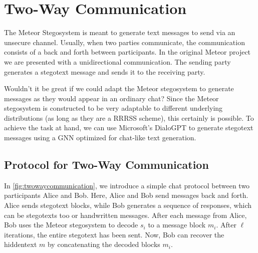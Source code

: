 \chapter{Two-Way Communication}
\label{chap:twowaycommunication}

The Meteor Stegosystem is meant to generate text messages to send via an unsecure channel.
Usually, when two parties communicate, the communication consists of a back and forth between participants.
In the original Meteor project we are presented with a unidirectional communication.
The sending party generates a stegotext message and sends it to the receiving party.

Wouldn't it be great if we could adapt the Meteor stegosystem to generate messages as they would appear in an ordinary chat?
Since the Meteor stegosystem is constructed to be very adaptable to different underlying distributions (as long as they are a RRRSS scheme), this certainly is possible.
To achieve the task at hand, we can use Microsoft's DialoGPT \cite{Zhang2020} to generate stegotext messages using a GNN optimized for chat-like text generation.

\section{Protocol for Two-Way Communication}

In \autoref{fig:twowaycommunication}, we introduce a simple chat protocol between two participants Alice and Bob.
Here, Alice and Bob send messages back and forth.
Alice sends stegotext blocks, while Bob generates a sequence of responses, which can be stegotexts too or handwritten messages.
After each message from Alice, Bob uses the Meteor stegosystem to decode $s_i$ to a message block $m_i$.
After $\ell$ iterations, the entire stegotext has been sent.
Now, Bob can recover the hiddentext $m$ by concatenating the decoded blocks $m_i$.


